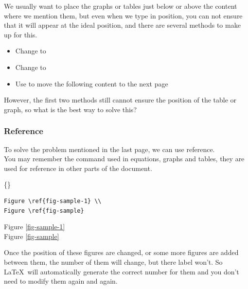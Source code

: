 \begin{frame}
	We usually want to place the graphs or tables just below or above the content where we mention them, but even when we type \structure{[h]} in position, you can not ensure that it will appear at the ideal position, and there are several methods to make up for this.
	\begin{itemize}
		\item Change \structure{[h]} to \structure{[!h]}
		\item Change \structure{[h]} to \structure{[H]}
		\item Use  to move the following content to the next page
	\end{itemize}
	However, the first two methods still cannot ensure the position of the table or graph, so what is the best way to solve this?
\end{frame}

\begin{frame}[fragile]
\frametitle{Reference}
	To solve the problem mentioned in the last page, we can use reference.\\
	You may remember the  command used in equations, graphs and tables, they are used for reference in other parts of the document.
	\begin{command}
		\{\}
	\end{command}
	\begin{example}
	\begin{minipage}{0.5\linewidth}
		\begin{verbatim}
Figure \ref{fig-sample-1} \\
Figure \ref{fig-sample}
		\end{verbatim}
	\end{minipage}
	\begin{minipage}{0.4\linewidth}
		Figure \ref{fig-sample-1} \\
		Figure \ref{fig-sample}
	\end{minipage}
	\end{example}
	Once the position of these figures are changed, or some more figures are added between them, the number of them will change, but there label won't. So \LaTeX\ will automatically generate the correct number for them and you don't need to modify them again and again.
\end{frame}

